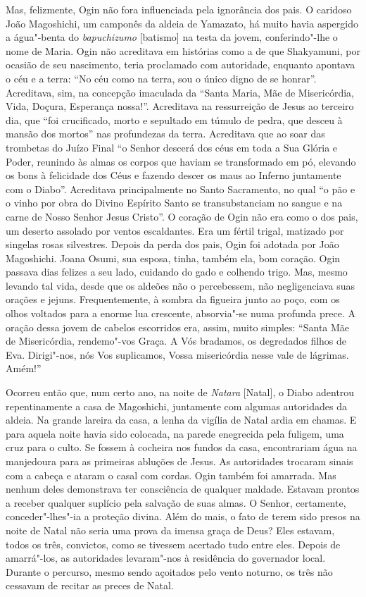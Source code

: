 Mas, felizmente, Ogin não fora influenciada pela ignorância dos pais. O
caridoso João Magoshichi, um camponês da aldeia de Yamazato, há muito
havia aspergido a água"-benta do \textit{bapuchizumo} [batismo] na testa
da jovem, conferindo"-lhe o nome de Maria. Ogin não acreditava em
histórias como a de que Shakyamuni, por ocasião de seu nascimento,
teria proclamado com autoridade, enquanto apontava o céu e a terra: ``No
céu como na terra, sou o único digno de se honrar''. Acreditava, sim,
na concepção imaculada da ``Santa Maria, Mãe de Misericórdia, Vida,
Doçura, Esperança nossa!''. Acreditava na ressurreição de Jesus ao
terceiro dia, que ``foi crucificado, morto e sepultado em túmulo de
pedra, que desceu à mansão dos mortos'' nas profundezas da terra.
Acreditava que ao soar das trombetas do Juízo Final ``o Senhor descerá
dos céus em toda a Sua Glória e Poder, reunindo às almas os corpos que
haviam se transformado em pó, elevando os bons à felicidade dos Céus e
fazendo descer os maus ao Inferno juntamente com o Diabo''. Acreditava
principalmente no Santo Sacramento, no qual ``o pão e o vinho por obra
do Divino Espírito Santo se transubstanciam no sangue e na carne de
Nosso Senhor Jesus Cristo''. O coração de Ogin não era como o dos pais,
um deserto assolado por ventos escaldantes. Era um fértil trigal,
matizado por singelas rosas silvestres. Depois da perda dos pais, Ogin
foi adotada por João Magoshichi. Joana Osumi, sua esposa, tinha, também
ela, bom coração. Ogin passava dias felizes a seu lado, cuidando do
gado e colhendo trigo. Mas, mesmo levando tal vida, desde que os
aldeões não o percebessem, não negligenciava suas orações e jejuns.
Frequentemente, à sombra da figueira junto ao poço, com os olhos
voltados para a enorme lua crescente, absorvia"-se numa profunda prece.
A oração dessa jovem de cabelos escorridos era, assim, muito simples:
``Santa Mãe de Misericórdia, rendemo"-vos Graça. A Vós bradamos, os
degredados filhos de Eva. Dirigi"-nos, nós Vos suplicamos, Vossa
misericórdia nesse vale de lágrimas. Amém!''

Ocorreu então que, num certo ano, na noite de \textit{Natara} [Natal], 
o Diabo adentrou repentinamente a casa de
Magoshichi, juntamente com algumas autoridades da aldeia. Na grande
lareira da casa, a lenha da vigília de Natal ardia em chamas. E para
aquela noite havia sido colocada, na parede enegrecida pela fuligem,
uma cruz para o culto. Se fossem à cocheira nos fundos da casa,
encontrariam água na manjedoura para as primeiras abluções de Jesus. As
autoridades trocaram sinais com a cabeça e ataram o casal com cordas.
Ogin também foi amarrada. Mas nenhum deles demonstrava ter consciência
de qualquer maldade. Estavam prontos a receber qualquer suplício pela
salvação de suas almas. O Senhor, certamente, conceder"-lhes"-ia a
proteção divina. Além do mais, o fato de terem sido presos na noite de
Natal não seria uma prova da imensa graça de Deus? Eles estavam, todos
os três, convictos, como se tivessem acertado tudo entre eles. Depois
de amarrá"-los, as autoridades levaram"-nos à residência do governador
local. Durante o percurso, mesmo sendo açoitados pelo vento noturno, os
três não cessavam de recitar as preces de Natal.

